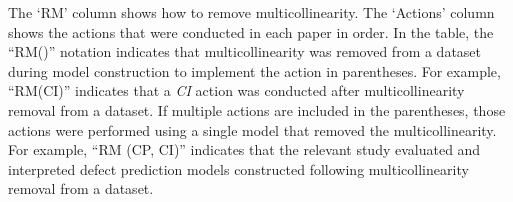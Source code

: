 The `RM' column shows how to remove multicollinearity.
The `Actions' column shows the actions that were conducted in each paper in order. %
In the table, the ``RM()'' notation indicates that multicollinearity was removed from a dataset during model construction to implement the action in parentheses. For example, ``RM(CI)'' indicates that a \textit{CI} action was conducted after multicollinearity removal from a dataset.
If multiple actions are included in the parentheses, those actions were performed using a single model that removed the multicollinearity. For example, ``RM (CP, CI)'' indicates that the relevant study evaluated and interpreted defect prediction models constructed following multicollinearity removal from a dataset.

